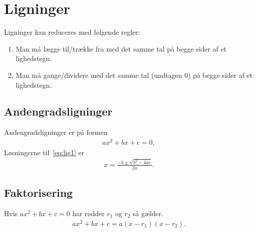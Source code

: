 \section{Ligninger}
Ligninger kan reduceres med følgende regler:
\begin{enumerate}
	\item Man må lægge til/trække fra med det samme tal på begge sider af et lighedstegn.
	\item Man må gange/dividere med det samme tal (undtagen 0) på begge sider af et lighedstegn.
\end{enumerate}
\subsection{Andengradsligninger}
Andengradsligninger er på formen
\begin{align}\label{eq:lig1}
ax^2+bx+c=0,
\end{align}
Løsningerne til~\eqref{eq:lig1} er
\begin{align*}
x=\frac{-b\pm \sqrt{b^2-4ac}}{2a}.
\end{align*}
\subsection{Faktorisering}
Hvis $ax^2+bx+c=0$ har rødder $r_1$ og $r_2$ så gælder.
\begin{align*}
ax^2+bx+c=a(x-r_1)(x-r_2).
\end{align*}